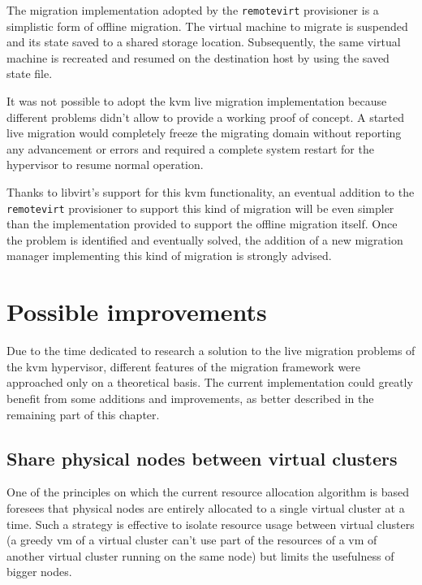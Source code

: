 The migration implementation adopted by the \texttt{remotevirt} provisioner is a simplistic form of offline migration. The virtual machine to migrate is suspended and its state saved to a shared storage location. Subsequently, the same virtual machine is recreated and resumed on the destination host by using the saved state file.

It was not possible to adopt the \gls{kvm} live migration implementation because different problems didn't allow to provide a working proof of concept. A started live migration would completely freeze the migrating domain without reporting any advancement or errors and required a complete system restart for the hypervisor to resume normal operation.

Thanks to libvirt's support for this \gls{kvm} functionality, an eventual addition to the \texttt{remotevirt} provisioner to support this kind of migration will be even simpler than the implementation provided to support the offline migration itself. Once the problem is identified and eventually solved, the addition of a new migration manager implementing this kind of migration is strongly advised.

\section{Possible improvements}
\label{sec:migration-improvements}

Due to the time dedicated to research a solution to the live migration problems of the \gls{kvm} hypervisor, different features of the migration framework were approached only on a theoretical basis. The current implementation could greatly benefit from some additions and improvements, as better described in the remaining part of this chapter.

\subsection{Share physical nodes between virtual clusters}

One of the principles on which the current resource allocation algorithm is based foresees that physical nodes are entirely allocated to a single virtual cluster at a time. Such a strategy is effective to isolate resource usage between virtual clusters (a greedy \gls{vm} of a virtual cluster can't use part of the resources of a \gls{vm} of another virtual cluster running on the same node) but limits the usefulness of bigger nodes.

